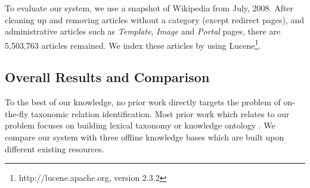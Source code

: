 To evaluate our system, we use a snapshot of Wikipedia from July,
2008. After cleaning up and removing articles without a category
(except redirect pages), and administrative articles such as {\em
  Template}, {\em Image} and {\em Portal} pages, there are 5,503,763
articles remained. We index these articles by using Lucene\footnote{http://lucene.apache.org, version
  2.3.2}.

\subsection{Overall Results and Comparison}
\label{sec:exp-results}



To the best of our knowledge, no prior work directly targets the
problem of on-the-fly taxonomic relation identification. Most prior
work which relates to our problem focuses on building lexical taxonomy
or knowledge ontology \cite{Snow2006,wikitaxo07,suchanek2007WWW}. We
compare our system with three offline knowledge bases which are built
upon different existing resources.

